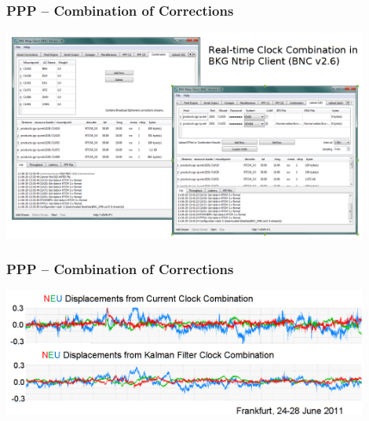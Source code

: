 \documentclass[10pt]{beamer}
\begin{document}

\begin{frame}
\frametitle{PPP -- Combination of Corrections}
  \begin{center}
    \includegraphics[width=0.9\textwidth,angle=0]{combination_1.png}
  \end{center}
\end{frame}


\begin{frame}
\frametitle{PPP -- Combination of Corrections}
  \begin{center}
    \includegraphics[width=0.9\textwidth,angle=0]{combination_2.png}
  \end{center}
\end{frame}

\end{document}
